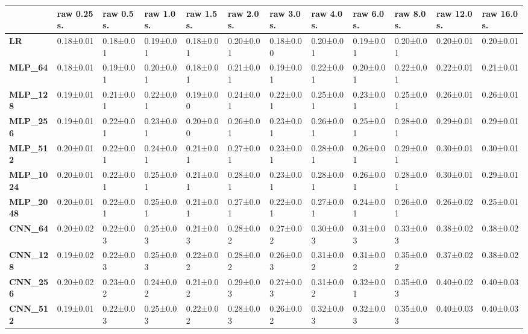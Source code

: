 \begin{tabular}{llllllllllll}
\toprule
{} & raw 0.25 s. & raw 0.5 s. & raw 1.0 s. & raw 1.5 s. & raw 2.0 s. & raw 3.0 s. & raw 4.0 s. & raw 6.0 s. & raw 8.0 s. & raw 12.0 s. & raw 16.0 s. \\
\midrule
\textbf{LR            } &   0.18±0.01 &  0.18±0.01 &  0.19±0.01 &  0.18±0.01 &  0.20±0.01 &  0.18±0.00 &  0.20±0.01 &  0.19±0.01 &  0.20±0.01 &   0.20±0.01 &   0.20±0.01 \\
\textbf{MLP\_64        } &   0.18±0.01 &  0.19±0.01 &  0.20±0.01 &  0.18±0.01 &  0.21±0.01 &  0.19±0.01 &  0.22±0.01 &  0.20±0.01 &  0.22±0.01 &   0.22±0.01 &   0.21±0.01 \\
\textbf{MLP\_128       } &   0.19±0.01 &  0.21±0.01 &  0.22±0.01 &  0.19±0.00 &  0.24±0.01 &  0.22±0.01 &  0.25±0.01 &  0.23±0.01 &  0.25±0.01 &   0.26±0.01 &   0.26±0.01 \\
\textbf{MLP\_256       } &   0.19±0.01 &  0.22±0.01 &  0.23±0.01 &  0.20±0.00 &  0.26±0.01 &  0.23±0.01 &  0.26±0.01 &  0.25±0.01 &  0.28±0.01 &   0.29±0.01 &   0.29±0.01 \\
\textbf{MLP\_512       } &   0.20±0.01 &  0.22±0.01 &  0.24±0.01 &  0.21±0.01 &  0.27±0.01 &  0.23±0.01 &  0.28±0.01 &  0.26±0.01 &  0.29±0.01 &   0.30±0.01 &   0.30±0.01 \\
\textbf{MLP\_1024      } &   0.20±0.01 &  0.22±0.01 &  0.25±0.01 &  0.21±0.01 &  0.28±0.01 &  0.23±0.01 &  0.28±0.01 &  0.26±0.01 &  0.28±0.01 &   0.30±0.01 &   0.29±0.01 \\
\textbf{MLP\_2048      } &   0.20±0.01 &  0.22±0.01 &  0.25±0.01 &  0.21±0.01 &  0.27±0.01 &  0.22±0.01 &  0.27±0.01 &  0.24±0.01 &  0.26±0.01 &   0.26±0.02 &   0.25±0.01 \\
\textbf{CNN\_64        } &   0.20±0.02 &  0.22±0.03 &  0.25±0.03 &  0.21±0.03 &  0.28±0.02 &  0.27±0.02 &  0.30±0.03 &  0.31±0.03 &  0.33±0.03 &   0.38±0.02 &   0.38±0.02 \\
\textbf{CNN\_128       } &   0.19±0.02 &  0.22±0.03 &  0.25±0.03 &  0.22±0.02 &  0.28±0.02 &  0.26±0.03 &  0.31±0.02 &  0.31±0.02 &  0.35±0.02 &   0.37±0.02 &   0.38±0.02 \\
\textbf{CNN\_256       } &   0.20±0.02 &  0.23±0.02 &  0.24±0.02 &  0.21±0.02 &  0.29±0.03 &  0.27±0.03 &  0.31±0.02 &  0.32±0.01 &  0.35±0.03 &   0.40±0.02 &   0.40±0.03 \\
\textbf{CNN\_512       } &   0.19±0.01 &  0.22±0.03 &  0.25±0.03 &  0.22±0.02 &  0.28±0.03 &  0.26±0.02 &  0.32±0.03 &  0.32±0.03 &  0.35±0.03 &   0.40±0.03 &   0.40±0.03 \\

\end{tabular}
